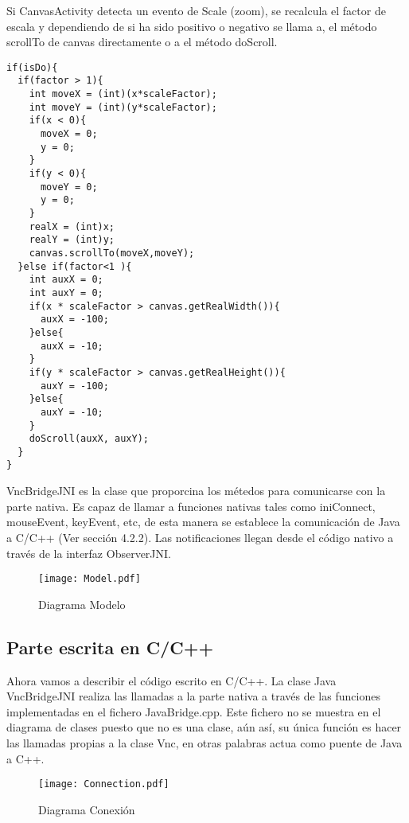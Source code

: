 Si CanvasActivity detecta un evento de Scale (zoom), se recalcula el factor de escala y dependiendo de si ha sido positivo o negativo se llama a, el método scrollTo de canvas directamente o a el método doScroll.
\begin{lstlisting}
if(isDo){
  if(factor > 1){		
    int moveX = (int)(x*scaleFactor);
    int moveY = (int)(y*scaleFactor);
    if(x < 0){
      moveX = 0;
      y = 0;
    }
    if(y < 0){
      moveY = 0;
      y = 0;
    }
    realX = (int)x;
    realY = (int)y;
    canvas.scrollTo(moveX,moveY);
  }else if(factor<1 ){
    int auxX = 0;
    int auxY = 0;
    if(x * scaleFactor > canvas.getRealWidth()){
      auxX = -100;
    }else{
      auxX = -10;
    }
    if(y * scaleFactor > canvas.getRealHeight()){
      auxY = -100;
    }else{
      auxY = -10;
    }
    doScroll(auxX, auxY);
  }
}
\end{lstlisting}

VncBridgeJNI es la clase que proporcina los métedos para comunicarse con la parte nativa. Es capaz de llamar a funciones nativas tales como iniConnect, mouseEvent, keyEvent, etc, de esta manera se establece la comunicación de Java a C/C++ (Ver sección 4.2.2). Las notificaciones llegan desde el código nativo a través de la interfaz ObserverJNI.

\begin{figure}[h]
\begin{center}
\texttt{[image: Model.pdf]}
\end{center}
\caption{Diagrama Modelo}
\end{figure}

\subsection{Parte escrita en C/C++}

Ahora vamos a describir el código escrito en C/C++. La clase Java VncBridgeJNI realiza las llamadas a la parte nativa a través de las funciones implementadas en el fichero JavaBridge.cpp. Este fichero no se muestra en el diagrama de clases puesto que no es una clase, aún así, su única función es hacer las llamadas propias a la clase Vnc, en otras palabras actua como puente de Java a C++.

\begin{figure}[h]
\begin{center}
\texttt{[image: Connection.pdf]}
\end{center}
\caption{Diagrama Conexión}
\end{figure}

